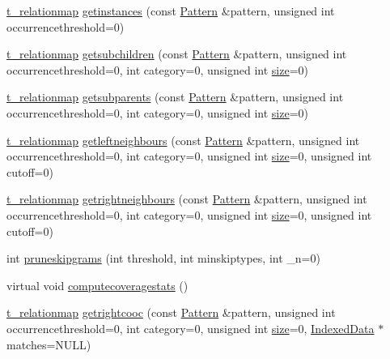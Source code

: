 \begin{DoxyCompactItemize}
\hyperlink{patternmodel_8h_a8695a2b10be5a74c827cd6c11bd46fb9}{t\+\_\+relationmap} \hyperlink{classIndexedPatternModel_a2942d0920ce1e646cb733c0c84fdd0d7}{getinstances} (const \hyperlink{classPattern}{Pattern} \&pattern, unsigned int occurrencethreshold=0)
\item 
\hyperlink{patternmodel_8h_a8695a2b10be5a74c827cd6c11bd46fb9}{t\+\_\+relationmap} \hyperlink{classIndexedPatternModel_a785f4b6ef4229843b90ba895957a1b56}{getsubchildren} (const \hyperlink{classPattern}{Pattern} \&pattern, unsigned int occurrencethreshold=0, int category=0, unsigned int \hyperlink{classPatternModel_a25f387acaf981af9962195bd05b3e7e2}{size}=0)
\item 
\hyperlink{patternmodel_8h_a8695a2b10be5a74c827cd6c11bd46fb9}{t\+\_\+relationmap} \hyperlink{classIndexedPatternModel_aed2ec73f5bece8595e6f6ab4f180ce75}{getsubparents} (const \hyperlink{classPattern}{Pattern} \&pattern, unsigned int occurrencethreshold=0, int category=0, unsigned int \hyperlink{classPatternModel_a25f387acaf981af9962195bd05b3e7e2}{size}=0)
\item 
\hyperlink{patternmodel_8h_a8695a2b10be5a74c827cd6c11bd46fb9}{t\+\_\+relationmap} \hyperlink{classIndexedPatternModel_a7d3909fc9e28191fa2f47be30b3dd99e}{getleftneighbours} (const \hyperlink{classPattern}{Pattern} \&pattern, unsigned int occurrencethreshold=0, int category=0, unsigned int \hyperlink{classPatternModel_a25f387acaf981af9962195bd05b3e7e2}{size}=0, unsigned int cutoff=0)
\item 
\hyperlink{patternmodel_8h_a8695a2b10be5a74c827cd6c11bd46fb9}{t\+\_\+relationmap} \hyperlink{classIndexedPatternModel_ab2d837b1f82f65b18ab6a7fc3ba2b15c}{getrightneighbours} (const \hyperlink{classPattern}{Pattern} \&pattern, unsigned int occurrencethreshold=0, int category=0, unsigned int \hyperlink{classPatternModel_a25f387acaf981af9962195bd05b3e7e2}{size}=0, unsigned int cutoff=0)
\item 
int \hyperlink{classIndexedPatternModel_a0df4f0e3a55dd00c0fe00fc3841f66ed}{pruneskipgrams} (int threshold, int minskiptypes, int \+\_\+n=0)
\item 
virtual void \hyperlink{classIndexedPatternModel_acf70c3536f4869b3e8330289f7409bf5}{computecoveragestats} ()
\item 
\hyperlink{patternmodel_8h_a8695a2b10be5a74c827cd6c11bd46fb9}{t\+\_\+relationmap} \hyperlink{classIndexedPatternModel_ad0d8258d41c372a17b91f8be08f3f305}{getrightcooc} (const \hyperlink{classPattern}{Pattern} \&pattern, unsigned int occurrencethreshold=0, int category=0, unsigned int \hyperlink{classPatternModel_a25f387acaf981af9962195bd05b3e7e2}{size}=0, \hyperlink{classIndexedData}{Indexed\+Data} $\ast$matches=N\+U\+L\+L)

\end{DoxyCompactItemize}
